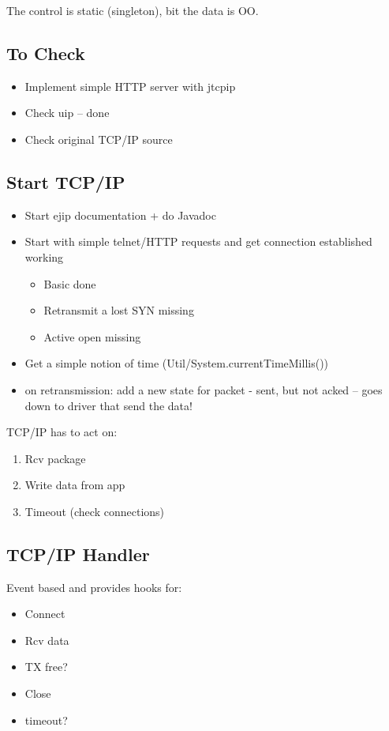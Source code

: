 The control is static (singleton), bit the data is OO.

\subsection{To Check}

\begin{itemize}
    \item Implement simple HTTP server with jtcpip
    \item Check uip -- done
    \item Check original TCP/IP source
\end{itemize}

\subsection{Start TCP/IP}

\begin{itemize}
    \item Start ejip documentation + do Javadoc
    \item Start with simple telnet/HTTP requests and get connection
    established working
    \begin{itemize}
        \item Basic done
        \item Retransmit a lost SYN missing
        \item Active open missing
    \end{itemize}
    \item Get a simple notion of time
    (Util/System.currentTimeMillis())
    \item on retransmission: add a new state for packet - sent, but
    not acked -- goes down to driver that send the data!
\end{itemize}

TCP/IP has to act on:
\begin{enumerate}
    \item Rcv package
    \item Write data from app
    \item Timeout (check connections)
\end{enumerate}

\subsection{TCP/IP Handler}

Event based and provides hooks for:
\begin{itemize}
    \item Connect
    \item Rcv data
    \item TX free?
    \item Close
    \item timeout?
\end{itemize}

